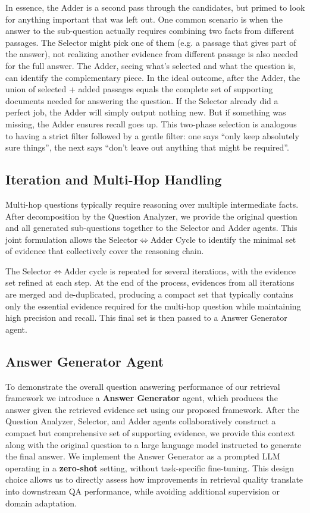 \documentclass{article} %
\begin{document}
In essence, the Adder is a second pass through the candidates, but primed to look for anything important that was left out. One common scenario is when the answer to the sub-question actually requires combining two facts from different passages. The Selector might pick one of them (e.g. a passage that gives part of the answer), not realizing another evidence from different passage is also needed for the full answer. The Adder, seeing what’s selected and what the question is, can identify the complementary piece. In the ideal outcome, after the Adder, the union of selected + added passages equals the complete set of supporting documents needed for answering the question. If the Selector already did a perfect job, the Adder will simply output nothing new. But if something was missing, the Adder ensures recall goes up. This two-phase selection is analogous to having a strict filter followed by a gentle filter: one says “only keep absolutely sure things”, the next says “don’t leave out anything that might be required”.

\subsection{Iteration and Multi-Hop Handling}
Multi-hop questions typically require reasoning over multiple intermediate facts. After decomposition by the Question Analyzer, we provide the original question and all generated sub-questions together to the Selector and Adder agents. This joint formulation allows the Selector$\Leftrightarrow$Adder Cycle to identify the minimal set of evidence that collectively cover the reasoning chain.  

The Selector$\Leftrightarrow$Adder cycle is repeated for several iterations, with the evidence set refined at each step. At the end of the process, evidences from all iterations are merged and de-duplicated, producing a compact set that typically contains only the essential evidence required for the multi-hop question while maintaining high precision and recall. This final set is then passed to a  Answer Generator agent. 

\subsection{Answer Generator Agent}
To demonstrate the overall question answering performance of our retrieval framework we introduce a \textbf{Answer Generator} agent, which produces the answer given the retrieved evidence set using our proposed framework. After the Question Analyzer, Selector, and Adder agents collaboratively construct a compact but comprehensive set of supporting evidence, we provide this context along with the original question to a large language model instructed to generate the final answer. We implement the Answer Generator as a prompted LLM operating in a \textbf{zero-shot} setting, without task-specific fine-tuning. 
This design choice allows us to directly assess how improvements in retrieval quality translate into downstream QA performance, while avoiding additional supervision or domain adaptation. 
\end{document}
